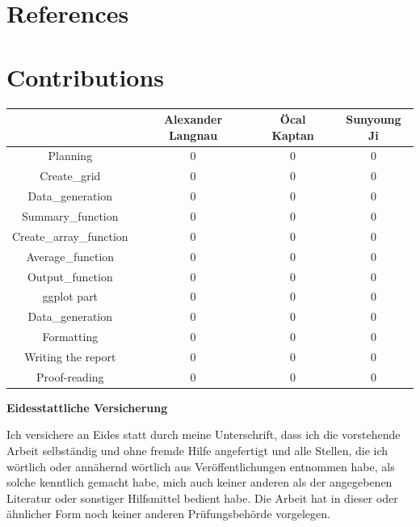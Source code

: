 \documentclass[11pt,a4paper]{article}
\begin{document}
\hypertarget{references}{%
\section{References}\label{references}}

\hypertarget{contributions}{%
\section{Contributions}\label{contributions}}

\begin{longtable}[]{@{}cccc@{}}
\toprule()
& Alexander Langnau & Öcal Kaptan & Sunyoung Ji \\
\midrule()
\endhead
Planning & 0 & 0 & 0 \\
Create\_grid & 0 & 0 & 0 \\
Data\_generation & 0 & 0 & 0 \\
Summary\_function & 0 & 0 & 0 \\
Create\_array\_function & 0 & 0 & 0 \\
Average\_function & 0 & 0 & 0 \\
Output\_function & 0 & 0 & 0 \\
ggplot part & 0 & 0 & 0 \\
Data\_generation & 0 & 0 & 0 \\
Formatting & 0 & 0 & 0 \\
Writing the report & 0 & 0 & 0 \\
Proof-reading & 0 & 0 & 0 \\
\bottomrule()
\end{longtable}

\pagebreak
\renewcommand*{\mkbibnamefamily}[1]{\textbf{#1}}
\renewcommand*{\mkbibnamegiven}[1]{\textbf{#1}}
\renewcommand*{\mkbibnameprefix}[1]{\textbf{#1}}
\renewcommand*{\mkbibnamesuffix}[1]{\textbf{#1}}
\printbibliography[title=References]

\newpage
\textbf{Eidesstattliche Versicherung}

\bigskip

Ich versichere an Eides statt durch meine Unterschrift, dass ich die vorstehende Arbeit selbständig und ohne fremde Hilfe angefertigt und alle Stellen, die ich wörtlich oder annähernd wörtlich aus Veröffentlichungen entnommen habe, als solche kenntlich gemacht habe, mich auch keiner anderen als der angegebenen Literatur oder sonstiger Hilfsmittel bedient habe. Die Arbeit hat in dieser oder ähnlicher Form noch keiner anderen Prüfungsbehörde vorgelegen.

\vspace{1cm}
\rule{0pt}{2\baselineskip} %
\par\noindent{} \hfill\makebox[2.25in]{\hrulefill}%
\par\noindent\makebox[2.25in][l]{} \hfill{}%
\end{document}
